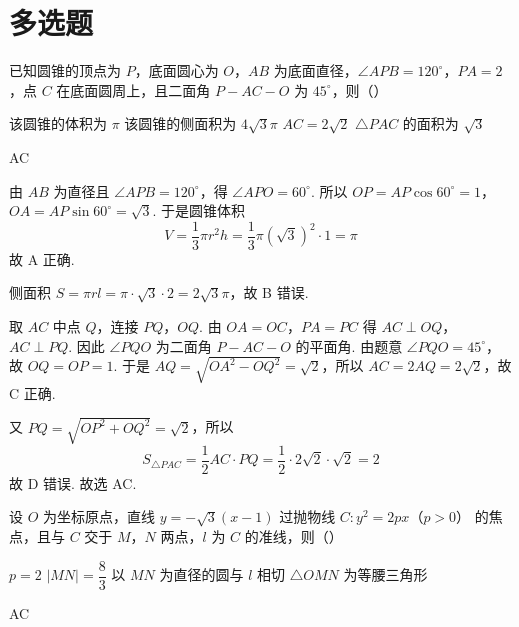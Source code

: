 \section{多选题}

\begin{problem}
已知圆锥的顶点为 \(P\)，底面圆心为 \(O\)，\(AB\) 为底面直径，\(\angle APB=120^\circ\)，\(PA=2\)，点 \(C\) 在底面圆周上，且二面角 \(P-AC-O\) 为 \(45^\circ\)，则（\quad）

\choices
    {该圆锥的体积为 \(\pi\)}
    {该圆锥的侧面积为 \(4\sqrt3\pi\)}
    {\(AC=2\sqrt2\)}
    {\(\triangle PAC\) 的面积为 \(\sqrt3\)}
\end{problem}

\begin{answer}
AC
\end{answer}

\begin{solution}
由 \(AB\) 为直径且 \(\angle APB=120^\circ\)，得 \(\angle APO=60^\circ\). 所以 \(OP=AP\cos 60^\circ=1\)，\(OA=AP\sin 60^\circ=\sqrt3\). 于是圆锥体积
\[
V=\frac13\pi r^2h=\frac13\pi(\sqrt3)^2\cdot 1=\pi
\]
故 A 正确.

侧面积 \(S=\pi rl=\pi\cdot\sqrt3\cdot2=2\sqrt3\pi\)，故 B 错误.

取 \(AC\) 中点 \(Q\)，连接 \(PQ\)，\(OQ\). 由 \(OA=OC\)，\(PA=PC\) 得 \(AC\perp OQ\)，\(AC\perp PQ\). 因此 \(\angle PQO\) 为二面角 \(P-AC-O\) 的平面角. 由题意 \(\angle PQO=45^\circ\)，故 \(OQ=OP=1\). 于是 \(AQ=\sqrt{OA^2-OQ^2}=\sqrt2\)，所以 \(AC=2AQ=2\sqrt2\)，故 C 正确.

又 \(PQ=\sqrt{OP^2+OQ^2}=\sqrt2\)，所以
\[
S_{\triangle PAC}=\frac12 AC\cdot PQ=\frac12\cdot2\sqrt2\cdot\sqrt2=2
\]
故 D 错误. 故选 AC.
\end{solution}

\begin{problem}
设 \(O\) 为坐标原点，直线 \(y=-\sqrt3(x-1)\) 过抛物线 \(C:y^2=2px\)（\(p>0\)） 的焦点，且与 \(C\) 交于 \(M\)，\(N\) 两点，\(l\) 为 \(C\) 的准线，则（\quad）

\choices
    {\(p=2\)}
    {\(|MN|=\dfrac83\)}
    {以 \(MN\) 为直径的圆与 \(l\) 相切}
    {\(\triangle OMN\) 为等腰三角形}
\end{problem}

\begin{answer}
AC
\end{answer}

